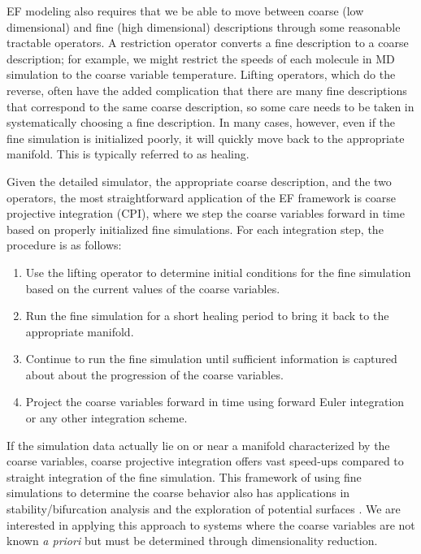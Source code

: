 \documentclass[12pt]{article}
\begin{document}
EF modeling also requires that we be able to move between coarse (low dimensional) and fine (high dimensional) descriptions through some reasonable tractable operators. A restriction operator converts a fine description to a coarse description; for example, we might restrict the speeds of each molecule in MD simulation to the coarse variable temperature. Lifting operators, which do the reverse, often have the added complication that there are many fine descriptions that correspond to the same coarse description, so some care needs to be taken in systematically choosing a fine description. In many cases, however, even if the fine simulation is initialized poorly, it will quickly move back to the appropriate manifold. This is typically referred to as healing. \vspace{1mm}

Given the detailed simulator, the appropriate coarse description, and the two operators, the most straightforward application of the EF framework is coarse projective integration (CPI), where we step the coarse variables forward in time based on properly initialized fine simulations. For each integration step, the procedure is as follows:  \vspace{1mm}

\begin{enumerate}
\item Use the lifting operator to determine initial conditions for the fine simulation based on the current values of the coarse variables.
\item Run the fine simulation for a short healing period to bring it back to the appropriate manifold.
\item Continue to run the fine simulation until sufficient information is captured about about the progression of the coarse variables.
\item Project the coarse variables forward in time using forward Euler integration or any other integration scheme.
\end{enumerate}

If the simulation data actually lie on or near a manifold characterized by the coarse variables, coarse projective integration offers vast speed-ups compared to straight integration of the fine simulation. This framework of using fine simulations to determine the coarse behavior also has applications in stability/bifurcation analysis \cite{Theodoropoulos2000} \cite{Gear2002} and the exploration of potential surfaces \cite{Frewen2009}. We are interested in applying this approach to systems where the coarse variables are not known \textit{a priori} but must be determined through dimensionality reduction.
\end{document}
